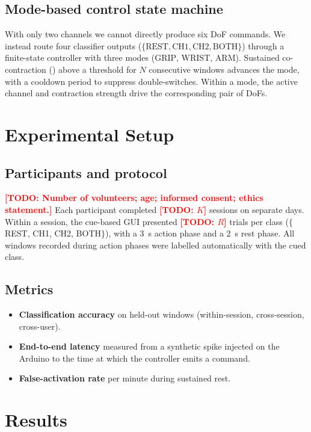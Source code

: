 \documentclass[conference]{IEEEtran}
\newcommand{\todo}[1]{\textcolor{red}{\textbf{[TODO: #1]}}}
\begin{document}
\subsection{Mode-based control state machine}
With only two channels we cannot directly produce six DoF commands. We
instead route four classifier outputs ($\{\text{REST}, \text{CH1},
\text{CH2}, \text{BOTH}\}$) through a finite-state controller with three
modes ($\text{GRIP}$, $\text{WRIST}$, $\text{ARM}$). Sustained
co-contraction () above a threshold for $N$ consecutive
windows advances the mode, with a cooldown period to suppress
double-switches. Within a mode, the active channel and contraction
strength drive the corresponding pair of DoFs.

\section{Experimental Setup}
\label{sec:experiments}

\subsection{Participants and protocol}
\todo{Number of volunteers; age; informed consent; ethics statement.}
Each participant completed \todo{$K$} sessions on separate days. Within a
session, the cue-based GUI presented \todo{$R$} trials per class
($\{$REST, CH1, CH2, BOTH$\}$), with a 3~s action phase and a 2~s rest
phase. All windows recorded during action phases were labelled
automatically with the cued class.

\subsection{Metrics}
\begin{itemize}
    \item \textbf{Classification accuracy} on held-out windows (within-session, cross-session, cross-user).
    \item \textbf{End-to-end latency} measured from a synthetic spike injected on the Arduino to the time at which the controller emits a command.
    \item \textbf{False-activation rate} per minute during sustained rest.
\end{itemize}

\section{Results}
\label{sec:results}
\end{document}
